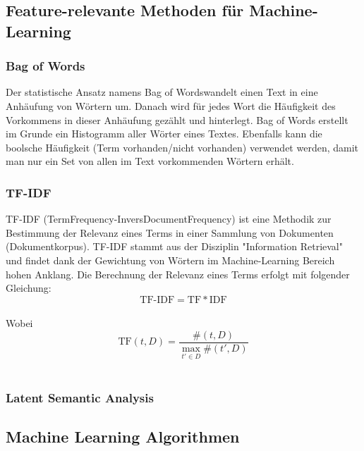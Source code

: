\subsection{Feature-relevante Methoden für Machine-Learning}
\subsubsection{Bag of Words}
Der statistische Ansatz namens \glqq Bag of Words\grqq wandelt einen Text in eine Anhäufung von Wörtern um.
Danach wird für jedes Wort die Häufigkeit des Vorkommens in dieser Anhäufung gezählt und hinterlegt.
Bag of Words erstellt im Grunde ein Histogramm aller Wörter eines Textes.
Ebenfalls kann die boolsche Häufigkeit (Term vorhanden/nicht vorhanden) verwendet werden, damit man nur ein Set von allen im Text vorkommenden Wörtern erhält.
\subsubsection{TF-IDF}
TF-IDF (TermFrequency-InversDocumentFrequency) ist eine Methodik zur Bestimmung der Relevanz eines Terms in einer Sammlung von Dokumenten (Dokumentkorpus).
TF-IDF stammt aus der Disziplin "Information Retrieval" und findet dank der Gewichtung von Wörtern im Machine-Learning Bereich hohen Anklang.
Die Berechnung der Relevanz eines Terms erfolgt mit folgender Gleichung:
\[\text{TF-IDF}=\text{TF}*\text{IDF}\]\\
Wobei
\[\text{TF}(t,D) = \frac{\#(t, D)}{\max_{t'\in D}\#(t', D)}\]\\
\subsubsection{Latent Semantic Analysis}

\subsection{Machine Learning Algorithmen}
